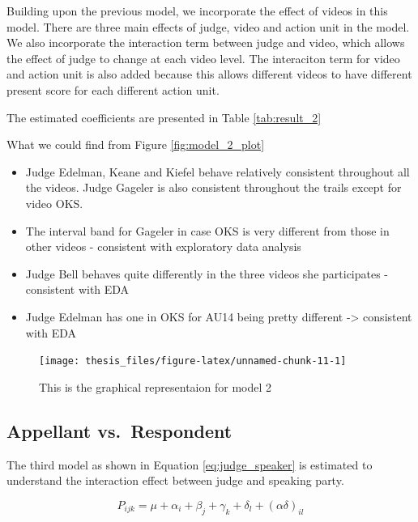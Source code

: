 \documentclass{monashthesis}
\begin{document}
Building upon the previous model, we incorporate the effect of videos in this model. There are three main effects of judge, video and action unit in the model. We also incorporate the interaction term between judge and video, which allows the effect of judge to change at each video level. The interaciton term for video and action unit is also added because this allows different videos to have different present score for each different action unit.

The estimated coefficients are presented in Table \ref{tab:result_2}

What we could find from Figure \ref{fig:model_2_plot}

\begin{itemize}
\item
  Judge Edelman, Keane and Kiefel behave relatively consistent throughout all the videos. Judge Gageler is also consistent throughout the trails except for video OKS.
\item
  The interval band for Gageler in case OKS is very different from those in other videos - consistent with exploratory data analysis
\item
  Judge Bell behaves quite differently in the three videos she participates - consistent with EDA
\item
  Judge Edelman has one in OKS for AU14 being pretty different -\textgreater{} consistent with EDA
\end{itemize}

\begin{figure}
\texttt{[image: thesis\_files/figure-latex/unnamed-chunk-11-1]} \caption{This is the graphical representaion for model 2\label{fig:model_2_plot}}\label{fig:unnamed-chunk-11}
\end{figure}

\hypertarget{appellant-vs.respondent}{%
\subsection{Appellant vs.~Respondent}\label{appellant-vs.respondent}}

The third model as shown in Equation \ref{eq:judge_speaker} is estimated to understand the interaction effect between judge and speaking party.

\begin{equation}\label{eq:judge_speaker}
P_{ijk} = \mu + \alpha_i + \beta_j +\gamma_k + \delta_l + (\alpha\delta)_{il}
\end{equation}
\end{document}
